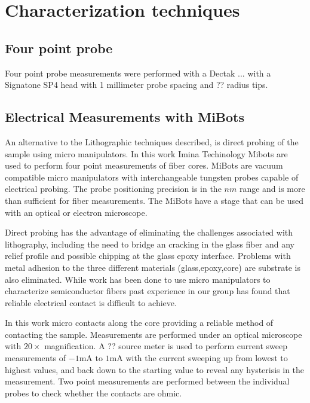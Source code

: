 \section{Characterization techniques}
\subsection{Four point probe }
Four point probe measurements were performed with a Dectak ... with a Signatone SP4 head with 1 millimeter probe spacing and ?? radius tips.

\subsection{Electrical Measurements with MiBots}
An alternative to the Lithographic techniques described, is direct probing of the sample using micro manipulators. In this work Imina Techinology Mibots are used to perform four point measurements of fiber cores. MiBots are vacuum compatible micro manipulators with interchangeable tungsten probes capable of electrical probing. The probe positioning precision is in the $\si{nm}$ range and is more than sufficient for fiber measurements. The MiBots have a stage that can be used with an optical or electron microscope. 

Direct probing has the advantage of eliminating the challenges associated with lithography, including the need to bridge an cracking in the glass fiber and any relief profile and possible chipping at the glass epoxy interface. Problems with metal adhesion to the three different materials (glass,epoxy,core) are substrate is also eliminated. While work has been done to use micro manipulators to characterize semiconductor fibers \cite{Engel2016DirectPhotosynthesis} past experience in our group has found that reliable electrical contact is difficult to achieve. %

In this work micro contacts along the core providing a reliable method of contacting the sample. Measurements are performed under an optical microscope with $20\times$ magnification. A ?? source meter is used to perform current sweep measurements of $-1 \si{\milli\ampere}$ to $1 \si{\milli\ampere}$ with the current sweeping up from lowest to highest values, and back down to the starting value to reveal any hysterisis in the measurement. Two point measurements are performed between the individual probes to check whether the contacts are ohmic. 



